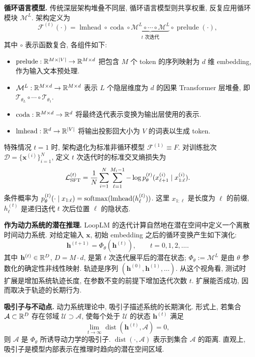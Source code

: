 \label{stars-sec-3}
\noindent\textbf{循环语言模型.}\label{stars-sec-3-1}
传统深层架构堆叠不同层, 循环语言模型则共享权重, 反复应用循环模块 $\mathcal M^L$. 架构定义为
\[
\mathcal F^{(t)}(\cdot)=\operatorname{lmhead}\circ\operatorname{coda}\circ
\underbrace{\mathcal M^L\circ\cdots\circ\mathcal M^L}_{t\text{ 次迭代}}\circ\operatorname{prelude}(\cdot),
\]
其中 $\circ$ 表示函数复合, 各组件如下:
\begin{itemize}
\item $\operatorname{prelude}:\mathbb R^{M\times|V|}\to\mathbb R^{M\times d}$ 把包含 $M$ 个 token 的序列映射为 $d$ 维 embedding, 作为输入文本预处理.
\item $\mathcal M^L:\mathbb R^{M\times d}\to\mathbb R^{M\times d}$ 表示 $L$ 个隐层维度为 $d$ 的因果 Transformer 层堆叠, 即 $\mathcal T_{\theta_L}\circ\cdots\circ\mathcal T_{\theta_1}$.
\item $\operatorname{coda}:\mathbb R^{M\times d}\to\mathbb R^d$ 将最终迭代表示变换为输出层使用的表示.
\item $\operatorname{lmhead}:\mathbb R^d\to\mathbb R^{|V|}$ 将输出投影回大小为 $V$ 的词表以生成 token.
\end{itemize}
特殊情况 $t=1$ 时, 架构退化为标准非循环模型 $\mathcal F^{(1)}\equiv F$. 对训练批次 $\mathcal D=\{\mathbf x^{(i)}\}_{i=1}^N$, 定义 $t$ 次迭代时的标准交叉熵损失为
\begin{equation}\label{stars-eq-1}
\mathcal L_{\rm SFT}^{(t)}=\frac1N\sum_{i=1}^N\sum_{\ell=1}^{M_i-1}
-\log p_\theta^{(t)}(x_{\ell+1}^{(i)}\mid x_{1:\ell}^{(i)}).
\end{equation}
条件概率为 $p_\theta^{(t)}(\cdot\mid x_{1:\ell})=\operatorname{softmax}(\operatorname{lmhead}(h_\ell^{(t)}))$. 这里 $x_{1:\ell}$ 是长度为 $\ell$ 的前缀, $h_\ell^{(t)}$ 是递归迭代 $t$ 次后位置 $\ell$ 的隐状态.

\noindent\textbf{作为动力系统的潜在推理.}\label{stars-sec-3-2}
LoopLM 的迭代计算自然地在潜在空间中定义一个离散时间动力系统. 对给定输入 $\mathbf x$, 初始 embedding 之后的循环变换产生如下演化:
\begin{equation}\label{stars-eq-2}
\mathbf h^{(t+1)}=\Phi_\theta(\mathbf h^{(t)}),\qquad t=0,1,2,\ldots.
\end{equation}
其中 $\mathbf h^{(t)}\in\mathbb R^D$, $D=M\cdot d$, 是第 $t$ 次迭代展平后的潜在状态; $\Phi_\theta:=\mathcal M^L$ 是由 $\theta$ 参数化的确定性非线性映射. 轨迹是序列 $(\mathbf h^{(0)},\mathbf h^{(1)},\ldots)$. 从这个视角看, 测试时扩展是增加系统轨迹长度, 在参数不变的前提下增加迭代次数 $t$. 扩展能否成功, 因而取决于轨迹的长期行为.

\noindent\textbf{吸引子与不动点.}\label{stars-attractors}
动力系统理论中, 吸引子描述系统的长期演化. 形式上, 若集合 $\mathcal A\subset\mathbb R^D$ 存在邻域 $\mathcal U\supset\mathcal A$, 使每个处于 $\mathcal U$ 的状态 $\mathbf h^{(t)}$ 满足
\[
\lim_{t\to\infty}\operatorname{dist}(\mathbf h^{(t)},\mathcal A)=0,
\]
则 $\mathcal A$ 是 $\Phi_\theta$ 所诱导动力学的吸引子. $\operatorname{dist}(\cdot,\mathcal A)$ 表示到集合 $\mathcal A$ 的距离. 直观上, 吸引子是模型内部表示在推理时趋向的潜在空间区域.


